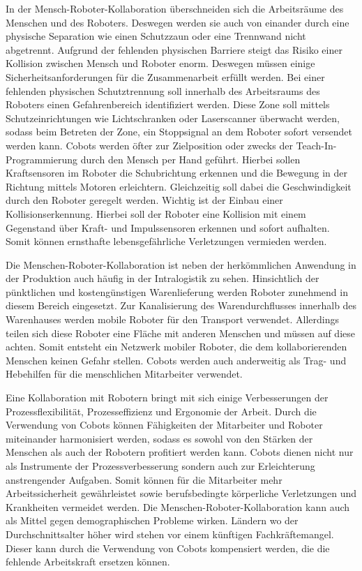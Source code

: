 In der Mensch-Roboter-Kollaboration überschneiden sich die Arbeitsräume des Menschen und des Roboters. Deswegen werden sie auch von einander durch eine physische Separation wie einen Schutzzaun oder eine Trennwand nicht abgetrennt. Aufgrund der fehlenden physischen Barriere steigt das Risiko einer Kollision zwischen Mensch und Roboter enorm. Deswegen müssen einige Sicherheitsanforderungen für die Zusammenarbeit erfüllt werden. Bei einer fehlenden physischen Schutztrennung soll innerhalb des Arbeitsraums des Roboters einen Gefahrenbereich identifiziert werden. Diese Zone soll mittels Schutzeinrichtungen wie Lichtschranken oder Laserscanner überwacht werden, sodass beim Betreten der Zone, ein Stoppsignal an dem Roboter sofort versendet werden kann. Cobots werden öfter zur Zielposition oder zwecks der Teach-In-Programmierung durch den Mensch per Hand geführt. Hierbei sollen Kraftsensoren im Roboter die Schubrichtung erkennen und die Bewegung in der Richtung mittels Motoren erleichtern. Gleichzeitig soll dabei die Geschwindigkeit durch den Roboter geregelt werden. Wichtig ist der Einbau einer Kollisionserkennung. Hierbei soll der Roboter eine Kollision mit einem Gegenstand über Kraft- und Impulssensoren erkennen und sofort aufhalten. Somit können ernsthafte lebensgefährliche Verletzungen vermieden werden. \autocite[12-16]{Schleicher2020}

Die Menschen-Roboter-Kollaboration ist neben der herkömmlichen Anwendung in der Produktion auch häufig in der Intralogistik zu sehen. Hinsichtlich der pünktlichen und kostengünstigen Warenlieferung werden Roboter zunehmend in diesem Bereich eingesetzt. Zur Kanalisierung des Warendurchflusses innerhalb des Warenhauses werden mobile Roboter für den Transport verwendet. Allerdings teilen sich diese Roboter eine Fläche mit anderen Menschen und müssen auf diese achten. Somit entsteht ein Netzwerk mobiler Roboter, die dem kollaborierenden Menschen keinen Gefahr stellen. Cobots werden auch anderweitig als Trag- und Hebehilfen für die menschlichen Mitarbeiter verwendet. \autocite[52]{Glück2022}

Eine Kollaboration mit Robotern bringt mit sich einige Verbesserungen der Prozessflexibilität, Prozesseffizienz und Ergonomie der Arbeit. Durch die Verwendung von Cobots können Fähigkeiten der Mitarbeiter und Roboter miteinander harmonisiert werden, sodass es sowohl von den Stärken der Menschen als auch der Robotern profitiert werden kann. Cobots dienen nicht nur als Instrumente der Prozessverbesserung sondern auch zur Erleichterung anstrengender Aufgaben. Somit können für die Mitarbeiter mehr Arbeitssicherheit gewährleistet sowie berufsbedingte körperliche Verletzungen und Krankheiten vermeidet werden. Die Menschen-Roboter-Kollaboration kann auch als Mittel gegen demographischen Probleme wirken. Ländern wo der Durchschnittsalter höher wird stehen vor einem künftigen Fachkräftemangel. Dieser kann durch die Verwendung von Cobots kompensiert werden, die die fehlende Arbeitskraft ersetzen können. \autocite[50]{Glück2022}

